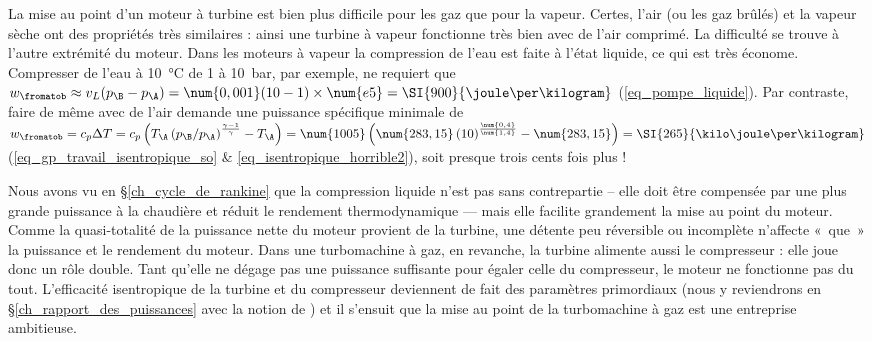 La mise au point d’un moteur à turbine est bien plus difficile pour les gaz que pour la vapeur. Certes, l’air (ou les gaz brûlés) et la vapeur sèche ont des propriétés très similaires : ainsi une turbine à vapeur fonctionne très bien avec de l’air comprimé. La difficulté se trouve à l’autre extrémité du moteur. Dans les moteurs à vapeur la compression de l’eau est faite à l’état liquide, ce qui est très économe. Compresser de l’eau à \SI{10}{\degreeCelsius} de \num{1} à \SI{10}{\bar}, par exemple, ne requiert que $w_\fromatob \approx v_L (p_\B - p_\A ) = \num{0,001} (10 - 1) \times \num{e5} = \SI{900}{\joule\per\kilogram}$ (\ref{eq_pompe_liquide}). Par contraste, faire de même avec de l’air demande une puissance spécifique minimale de $w_\fromatob = c_p \Delta T = c_p \left( T_\A \left(p_\B/p_\A\right)^\frac{\gamma - 1}{\gamma} - T_\A \right) = \num{1005} \left(\num{283,15} \left(10\right)^\frac{\num{0,4}}{\num{1,4}} - \num{283,15} \right) = \SI{265}{\kilo\joule\per\kilogram}$ (\ref{eq_gp_travail_isentropique_so} \& \ref{eq_isentropique_horrible2}), soit presque trois cents fois plus !

Nous avons vu en \S\ref{ch_cycle_de_rankine} que la compression liquide n’est pas sans contrepartie – elle doit être compensée par une plus grande puissance à la chaudière et réduit le rendement thermodynamique — mais elle facilite grandement la mise au point du moteur. Comme la quasi-totalité de la puissance nette du moteur provient de la turbine, une détente peu réversible ou incomplète n’affecte «~que~» la puissance et le rendement du moteur. Dans une turbomachine à gaz, en revanche, la turbine alimente aussi le compresseur : elle joue donc un rôle double. Tant qu’elle ne dégage pas une puissance suffisante pour égaler celle du compresseur, le moteur ne fonctionne pas du tout. L’efficacité isentropique de la turbine et du compresseur deviennent de fait des paramètres primordiaux (nous y reviendrons en \S\ref{ch_rapport_des_puissances} avec la notion de ) et il s’ensuit que la mise au point de la turbomachine à gaz est une entreprise ambitieuse.

